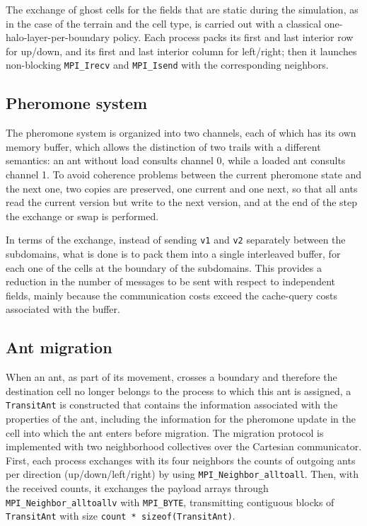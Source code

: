 The exchange of ghost cells for the fields that are static during the simulation, as in the case of the terrain and the cell type, is carried out with a classical one-halo-layer-per-boundary policy. Each process packs its first and last interior row for up/down, and its first and last interior column for left/right; then it launches non-blocking \texttt{MPI\_Irecv} and \texttt{MPI\_Isend} with the corresponding neighbors.


\subsection{Pheromone system}
The pheromone system is organized into two channels, each of which has its own memory buffer, which allows the distinction of two trails with a different semantics: an ant without load consults channel 0, while a loaded ant consults channel 1. To avoid coherence problems between the current pheromone state and the next one, two copies are preserved, one current and one next, so that all ants read the current version but write to the next version, and at the end of the step the exchange or swap is performed.

In terms of the exchange, instead of sending \texttt{v1} and \texttt{v2} separately between the subdomains, what is done is to pack them into a single interleaved buffer, for each one of the cells at the boundary of the subdomains. This provides a reduction in the number of messages to be sent with respect to independent fields, mainly because the communication costs exceed the cache-query costs associated with the buffer.


\subsection{Ant migration}


When an ant, as part of its movement, crosses a boundary and therefore the destination cell no longer belongs to the process to which this ant is assigned, a \texttt{TransitAnt} is constructed that contains the information associated with the properties of the ant, including the information for the pheromone update in the cell into which the ant enters before migration. The migration protocol is implemented with two neighborhood collectives over the Cartesian communicator. First, each process exchanges with its four neighbors the counts of outgoing ants per direction (up/down/left/right) by using \texttt{MPI\_Neighbor\_alltoall}. Then, with the received counts, it exchanges the payload arrays through \texttt{MPI\_Neighbor\_alltoallv} with \texttt{MPI\_BYTE}, transmitting contiguous blocks of \texttt{TransitAnt} with size \texttt{count * sizeof(TransitAnt)}.

